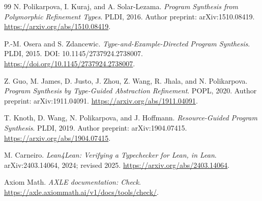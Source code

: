 \documentclass[11pt,letterpaper]{article}
\theoremstyle{definition}
\theoremstyle{remark}
\begin{document}
\begin{thebibliography}{99}
N. Polikarpova, I. Kuraj, and A. Solar-Lezama.
\emph{Program Synthesis from Polymorphic Refinement Types}.
PLDI, 2016. Author preprint: arXiv:1510.08419.
\url{https://arxiv.org/abs/1510.08419}.

P.-M. Osera and S. Zdancewic.
\emph{Type-and-Example-Directed Program Synthesis}.
PLDI, 2015. DOI: 10.1145/2737924.2738007.
\url{https://doi.org/10.1145/2737924.2738007}.

Z. Guo, M. James, D. Justo, J. Zhou, Z. Wang, R. Jhala, and N. Polikarpova.
\emph{Program Synthesis by Type-Guided Abstraction Refinement}.
POPL, 2020. Author preprint: arXiv:1911.04091.
\url{https://arxiv.org/abs/1911.04091}.

T. Knoth, D. Wang, N. Polikarpova, and J. Hoffmann.
\emph{Resource-Guided Program Synthesis}.
PLDI, 2019. Author preprint: arXiv:1904.07415.
\url{https://arxiv.org/abs/1904.07415}.

M. Carneiro.
\emph{Lean4Lean: Verifying a Typechecker for Lean, in Lean}.
arXiv:2403.14064, 2024; revised 2025.
\url{https://arxiv.org/abs/2403.14064}.

Axiom Math.
\emph{AXLE documentation: Check}.
\url{https://axle.axiommath.ai/v1/docs/tools/check/}.
\end{thebibliography}
\end{document}
